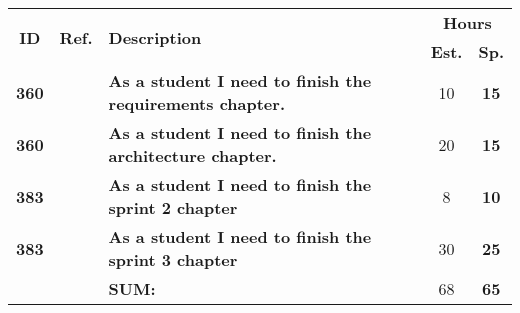   \label{tab:sprint3stories}
 \def\arraystretch{1.25}
 
\begin{longtable}{ccXcc}

\toprule[0.5mm]
\multirow{2}{*}{\textbf{ID}} &
\multirow{2}{*}{\textbf{Ref.}} & \multirow{2}{*}{\textbf{Description}} & \multicolumn{2}{c}{\textbf{Hours}} \\
 					& & & \textbf{Est.} & \textbf{Sp.} \\
\midrule

\textbf{360} 	&   & {\bf As a student I need to finish the requirements chapter.} 			& 	10	& \textbf{ 15} \\

\textbf{360} 	&   & {\bf As a student I need to finish the architecture chapter.} 			& 	20  & \textbf{ 15} \\
	
\textbf{383} 	&	& {\bf As a student I need to finish the sprint 2 chapter} 					&   8  & \textbf{10} \\

\textbf{383} 	&	& {\bf As a student I need to finish the sprint 3 chapter} 					& 	30 & \textbf{25} \\


\midrule
		
				&	& \textbf{SUM:}		&		68	& \textbf{65}
 \\																			
\bottomrule[0.5mm]
\end{longtable}
